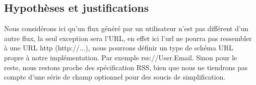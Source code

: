 \documentclass[11pt]{article}
\begin{document}
\subsection{Hypothèses et justifications}
Nous considérons ici qu'un flux généré par un utilisateur n'est pas différent d'un autre flux, la seul exception sera l'URL, en effet ici l'url ne pourra pas ressembler à une URL http (http://...), nous pourrons définir un type de schéma URL propre à notre implémentation. Par exemple rss://User.Email. Sinon pour le reste, nous restons proche des spécification RSS, bien que nous ne tiendrons pas compte d'une série de champ optionnel pour des soucis de simplification.
\end{document}
